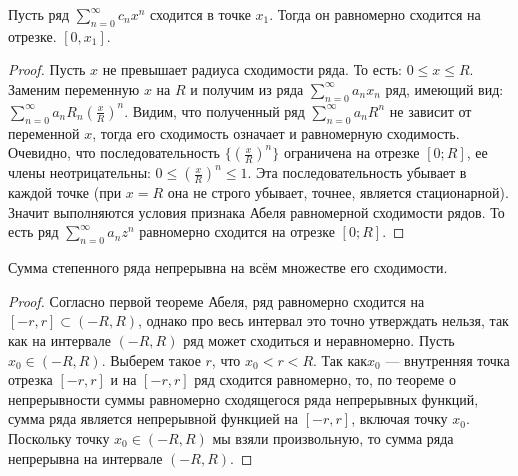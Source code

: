 \documentclass[a4paper, 12pt]{article}
\begin{document}
\begin{Theorem} [Абеля II]
	Пусть ряд $\sum\limits_{n = 0}^{\infty}c_n x^n$ сходится в точке $x_1$. Тогда он равномерно сходится на отрезке. $[0, x_1]$.
\end{Theorem}

\begin{proof}
Пусть $x$ не превышает радиуса сходимости ряда. То есть: $0 \leq x\leq R$. Заменим переменную $x$ на $R$ и получим из ряда $\sum\limits_{n=0}^{\infty}a_{n}x_{n}$ ряд, имеющий вид: $\sum\limits_{n=0}^{\infty}a_{n}R_{n}\left ( \frac{x}{R} \right )^{n}$. Видим, что полученный ряд $\sum\limits_{n=0}^{\infty}a_{n}R^{n}$ не зависит от переменной $x$, тогда его сходимость означает и равномерную сходимость. Очевидно, что последовательность $\{ \left ( \frac{x}{R} \right )^{n}\}$ ограничена на отрезке $\left [ 0;R \right ]$, ее члены неотрицательны: $0\leq\left ( \frac{x}{R} \right )^{n}\leq 1$. Эта последовательность убывает в каждой точке (при  $x=R$ она не строго убывает, точнее, является стационарной). Значит выполняются условия признака Абеля равномерной сходимости рядов. То есть ряд $\sum\limits_{n=0}^{\infty}a_{n}z^{n}$ равномерно сходится на отрезке $\left [ 0;R \right ]$.
\end{proof}

\begin{Consequence}
Сумма степенного ряда непрерывна на всём множестве его сходимости.
\end{Consequence}

\begin{proof}
Согласно первой теореме Абеля, ряд равномерно сходится на $\left [ -r,r \right ] \subset \left ( -R, R \right )$, однако про весь интервал это точно утверждать нельзя, так как на интервале $\left ( -R, R \right )$ ряд может сходиться и неравномерно. Пусть $x_{0}\in\left ( -R, R \right )$. Выберем такое $r$, что $x_{0}<r<R$. Так как$ x_{0}$ --- внутренняя точка отрезка $\left [ -r,r \right ]$ и на $\left [ -r,r \right ]$ ряд  сходится равномерно, то, по теореме о непрерывности суммы равномерно сходящегося ряда непрерывных функций, сумма ряда является непрерывной функцией на $\left [ -r,r \right ]$, включая точку $x_{0}$.
Поскольку точку $x_{0}\in\left ( -R, R \right )$ мы взяли произвольную, то сумма ряда непрерывна на интервале $\left ( -R, R \right )$.



\end{proof}
\end{document}

